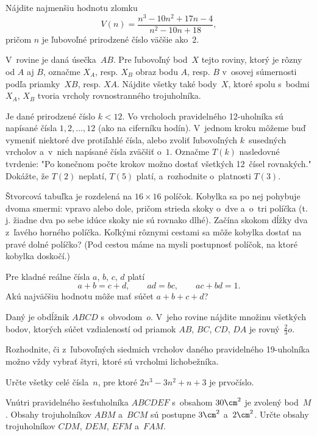 {%
Nájdite najmenšiu hodnotu zlomku
$$
V(n)=\dfrac{n^3-10n^2+17n-4}{n^2-10n+18},
$$
pričom $n$ je ľubovoľné prirodzené číslo väčšie ako~$2$.}

{%
V~rovine je daná úsečka~$AB$. Pre ľubovoľný bod~$X$ tejto roviny, ktorý je rôzny
od $A$ aj $B$, označme $X_A$, resp.
$X_B$ obraz bodu $A$, resp. $B$  v~osovej súmernosti podľa priamky~$XB$,
resp. $XA$. Nájdite všetky také body~$X$, ktoré spolu s~bodmi $X_A$,
$X_B$ tvoria vrcholy rovnostranného trojuholníka.}

{%
Je dané prirodzené číslo $k<12$. Vo vrcholoch pravidelného 12-uholníka sú
napísané čísla $1,2,\dots,12$ (ako na ciferníku hodín). V~jednom kroku
môžeme buď vymeniť niektoré dve protiľahlé čísla, alebo
zvoliť ľubovoľných $k$~susedných vrcholov a~v~nich napísané čísla zväčšiť o~$1$.
Označme $T(k)$ nasledovné tvrdenie: "Po konečnom počte krokov možno dostať všetkých
12~čísel rovnakých."
Dokážte, že $T(2)$ neplatí, $T(5)$ platí, a~rozhodnite o~platnosti $T(3)$.}

{%
Štvorcová tabuľka je rozdelená na $16\times16$ políčok. Kobylka sa po nej
pohybuje dvoma smermi: vpravo alebo dole, pričom
strieda skoky o~dve a~o~tri políčka (t.\,j. žiadne dva po sebe idúce
skoky nie sú rovnako dlhé). Začína skokom dĺžky dva
z~ľavého horného políčka. Koľkými rôznymi cestami sa môže
kobylka dostať na pravé dolné políčko? (Pod cestou máme na mysli
postupnosť políčok, na ktoré kobylka doskočí.)}

{%
Pre kladné reálne čísla $a$, $b$, $c$, $d$ platí
$$
a+b=c+d,\qquad ad = bc,\qquad ac+bd = 1.
$$
Akú najväčšiu hodnotu môže mať súčet $a+b+c+d$?}

{%
Daný je obdĺžnik $ABCD$ s~obvodom~$o$. V~jeho rovine nájdite množinu všetkých bodov,
ktorých súčet vzdialeností od priamok $AB$, $BC$, $CD$, $DA$ je
rovný~$\frac23o$.}

{%
Rozhodnite, či z~ľubovoľných siedmich vrcholov daného pravidelného
19-uholníka možno vždy vybrať štyri, ktoré sú vrcholmi lichobežníka.}

{%
Určte všetky celé čísla~$n$, pre ktoré $2n^3-3n^2+n+3$ je prvočíslo.}

{%
Vnútri pravidelného šesťuholníka $ABCDEF$ s~obsahom $30\cm^2$ je zvolený
bod~$M$. Obsahy trojuholníkov $ABM$ a~$BCM$ sú postupne $3\cm^2$
a~$2\cm^2$. Určte obsahy trojuholníkov $CDM$,  $DEM$,  $EFM$ a~$FAM$.}

